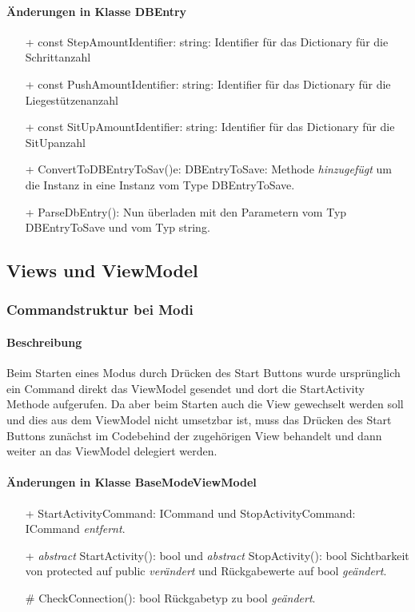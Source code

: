 \documentclass[a4paper,12pt]{article}
\begin{document}
\paragraph{Änderungen in Klasse DBEntry}

\begin{itemize}
	\item[+] const StepAmountIdentifier: string: Identifier für das Dictionary für die Schrittanzahl
	\item[+] const PushAmountIdentifier: string: Identifier für das Dictionary für die Liegestützenanzahl
	\item[+] const SitUpAmountIdentifier: string: Identifier für das Dictionary für die SitUpanzahl
	\item[+] ConvertToDBEntryToSav()e: DBEntryToSave: Methode \textit{hinzugefügt} um die Instanz in eine Instanz vom Type DBEntryToSave. 
	\item[+] ParseDbEntry(): Nun überladen mit den Parametern vom Typ DBEntryToSave und vom Typ string.
	
\end{itemize}

\subsection{Views und ViewModel}

\subsubsection{Commandstruktur bei Modi}
\paragraph{Beschreibung}
Beim Starten eines Modus durch Drücken des Start Buttons wurde ursprünglich ein Command direkt das ViewModel gesendet und dort die StartActivity Methode aufgerufen. Da aber beim Starten auch die View gewechselt werden soll und dies aus dem ViewModel nicht umsetzbar ist, muss das Drücken des Start Buttons zunächst im Codebehind der zugehörigen View behandelt und dann weiter an das ViewModel delegiert werden. 
\paragraph{Änderungen in Klasse BaseModeViewModel}
\begin{itemize}
	\item[+] StartActivityCommand: ICommand und StopActivityCommand: ICommand \textit{entfernt}.
	\item[+] \textit{abstract} StartActivity(): bool und \textit{abstract} StopActivity(): bool Sichtbarkeit von protected auf public \textit{verändert} und Rückgabewerte auf bool \textit{geändert}.
	\item[\#] CheckConnection(): bool Rückgabetyp zu bool \textit{geändert}.
\end{itemize}
\end{document}
